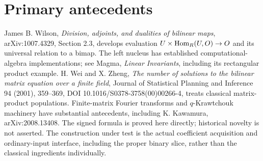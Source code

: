 \documentclass[11pt]{article}
\begin{document}
\section{Primary antecedents}
James B. Wilson, \emph{Division, adjoints, and dualities of bilinear maps},
arXiv:1007.4329, Section 2.3, develops evaluation
$U\times\operatorname{Hom}_R(U,O)\to O$ and its universal relation to a bimap.
The left nucleus has established computational-algebra implementations; see
Magma, \emph{Linear Invariants}, including its rectangular product example.
H. Wei and X. Zheng, \emph{The number of solutions to the bilinear matrix
equation over a finite field}, Journal of Statistical Planning and Inference
94 (2001), 359--369, DOI 10.1016/S0378-3758(00)00266-4, treats classical
matrix-product populations. Finite-matrix Fourier transforms and
$q$-Krawtchouk machinery have substantial antecedents, including
K. Kawamura, arXiv:2008.13408. The signed formula is proved here directly;
historical novelty is not asserted. The construction under test is the actual
coefficient acquisition and ordinary-input interface, including the proper
binary slice, rather than the classical ingredients individually.
\end{document}
